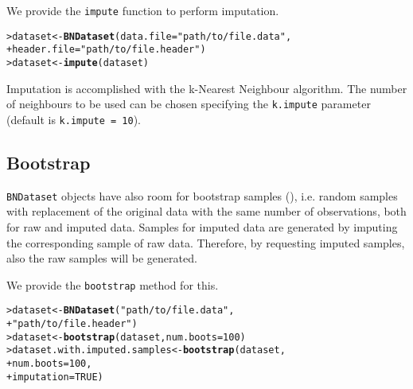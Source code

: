 \documentclass{article}\usepackage[]{graphicx}\usepackage[]{color}
\makeatletter
\newcommand{\hlnum}[1]{\textcolor[rgb]{0.686,0.059,0.569}{#1}}%
\newcommand{\hlstr}[1]{\textcolor[rgb]{0.192,0.494,0.8}{#1}}%
\newcommand{\hlstd}[1]{\textcolor[rgb]{0.345,0.345,0.345}{#1}}%
\newcommand{\hlkwb}[1]{\textcolor[rgb]{0.69,0.353,0.396}{#1}}%
\newcommand{\hlkwc}[1]{\textcolor[rgb]{0.333,0.667,0.333}{#1}}%
\newcommand{\hlkwd}[1]{\textcolor[rgb]{0.737,0.353,0.396}{\textbf{#1}}}%
\newenvironment{kframe}{%
 \def\at@end@of@kframe{}%
 \ifinner\ifhmode%
  \def\at@end@of@kframe{\end{minipage}}%
  \begin{minipage}{\columnwidth}%
 \fi\fi%
 \def\FrameCommand##1{\hskip\@totalleftmargin \hskip-\fboxsep
 \colorbox{shadecolor}{##1}\hskip-\fboxsep
     \hskip-\linewidth \hskip-\@totalleftmargin \hskip\columnwidth}%
 \MakeFramed {\advance\hsize-\width
   \@totalleftmargin\z@ \linewidth\hsize
   \@setminipage}}%
 {\par\unskip\endMakeFramed%
 \at@end@of@kframe}
\newenvironment{knitrout}{}{} %
\newcommand{\Robject}[1]{{\texttt{#1}}}
\newcommand{\Rmethod}[1]{{\texttt{#1}}}
\newcommand{\Rfunarg}[1]{{\texttt{#1}}}
\makeatother
\begin{document}
We provide the \Rmethod{impute} function to perform imputation.
\begin{knitrout}
\color{fgcolor}\begin{kframe}
\begin{alltt}
\hlstd{> }\hlstd{dataset} \hlkwb{<-} \hlkwd{BNDataset}\hlstd{(}\hlkwc{data.file}   \hlstd{=} \hlstr{"path/to/file.data"}\hlstd{,}
\hlstd{+ }                     \hlkwc{header.file} \hlstd{=} \hlstr{"path/to/file.header"}\hlstd{)}
\hlstd{> }\hlstd{dataset} \hlkwb{<-} \hlkwd{impute}\hlstd{(dataset)}
\end{alltt}
\end{kframe}
\end{knitrout}

Imputation is accomplished with the k-Nearest Neighbour algorithm. The number of neighbours to be used
can be chosen specifying the \Rfunarg{k.impute} parameter (default is \Rfunarg{k.impute = 10}).


\subsection{Bootstrap}
\Robject{BNDataset} objects have also room for bootstrap samples (\citet{efron1994introduction}), i.e. random samples with replacement of the original data
with the same number of observations, both for raw and imputed data.
Samples for imputed data are generated by imputing the corresponding sample of raw data.
Therefore, by requesting imputed samples, also the raw samples will be generated.

We provide the \Rmethod{bootstrap} method for this.
\begin{knitrout}
\color{fgcolor}\begin{kframe}
\begin{alltt}
\hlstd{> }\hlstd{dataset} \hlkwb{<-} \hlkwd{BNDataset}\hlstd{(}\hlstr{"path/to/file.data"}\hlstd{,}
\hlstd{+ }                     \hlstr{"path/to/file.header"}\hlstd{)}
\hlstd{> }\hlstd{dataset} \hlkwb{<-} \hlkwd{bootstrap}\hlstd{(dataset,} \hlkwc{num.boots} \hlstd{=} \hlnum{100}\hlstd{)}
\hlstd{> }\hlstd{dataset.with.imputed.samples} \hlkwb{<-} \hlkwd{bootstrap}\hlstd{(dataset,}
\hlstd{+ }                                          \hlkwc{num.boots} \hlstd{=} \hlnum{100}\hlstd{,}
\hlstd{+ }                                          \hlkwc{imputation} \hlstd{=} \hlnum{TRUE}\hlstd{)}
\end{alltt}
\end{kframe}
\end{knitrout}
\end{document}
